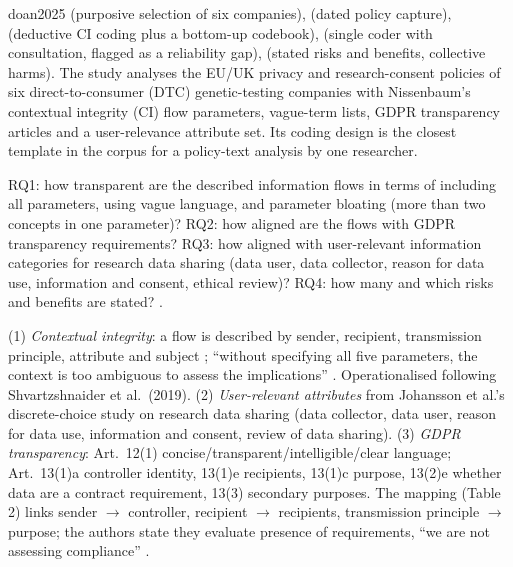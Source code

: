 \begin{papercard}{doan2025}
  (purposive selection of six companies),  (dated policy capture),  (deductive CI coding plus a bottom-up codebook),  (single coder with consultation, flagged as a reliability gap),  (stated risks and benefits, collective harms). The study analyses the EU/UK privacy and research-consent policies of six direct-to-consumer (DTC) genetic-testing companies with Nissenbaum's contextual integrity (CI) flow parameters, vague-term lists, GDPR transparency articles and a user-relevance attribute set. Its coding design is the closest template in the corpus for a policy-text analysis by one researcher.

 RQ1: how transparent are the described information flows in terms of including all parameters, using vague language, and parameter bloating (more than two concepts in one parameter)? RQ2: how aligned are the flows with GDPR transparency requirements? RQ3: how aligned with user-relevant information categories for research data sharing (data user, data collector, reason for data use, information and consent, ethical review)? RQ4: how many and which risks and benefits are stated? .

 (1) \emph{Contextual integrity}: a flow is described by sender, recipient, transmission principle, attribute and subject ; ``without specifying all five parameters, the context is too ambiguous to assess the implications'' . Operationalised following Shvartzshnaider et al.\ (2019). (2) \emph{User-relevant attributes} from Johansson et al.'s discrete-choice study on research data sharing (data collector, data user, reason for data use, information and consent, review of data sharing). (3) \emph{GDPR transparency}: Art.\ 12(1) concise/transparent/intelligible/clear language; Art.\ 13(1)a controller identity, 13(1)e recipients, 13(1)c purpose, 13(2)e whether data are a contract requirement, 13(3) secondary purposes. The mapping (Table 2) links sender $\to$ controller, recipient $\to$ recipients, transmission principle $\to$ purpose; the authors state they evaluate presence of requirements, ``we are not assessing compliance'' .


\end{papercard}
